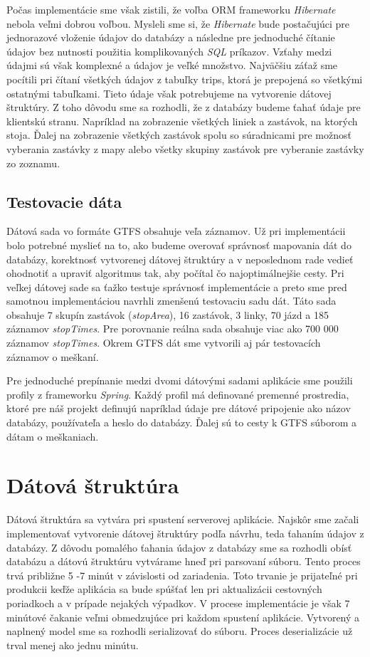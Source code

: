 Počas implementácie sme však zistili, že voľba ORM frameworku \textit{Hibernate} nebola veľmi dobrou voľbou. Mysleli sme si, že \textit{Hibernate} bude postačujúci pre jednorazové vloženie údajov do databázy a následne pre jednoduché čítanie údajov bez nutnosti použitia komplikovaných \textit{SQL} príkazov. Vzťahy medzi údajmi sú však komplexné a údajov je veľké množstvo. Najväčšiu záťaž sme pocítili pri čítaní všetkých údajov z tabuľky trips, ktorá je prepojená so všetkými ostatnými tabuľkami. Tieto údaje však potrebujeme na vytvorenie dátovej štruktúry. Z toho dôvodu sme sa rozhodli, že z databázy budeme ťahať údaje pre klientskú stranu. Napríklad na zobrazenie všetkých liniek a zastávok, na ktorých stoja. Ďalej na zobrazenie všetkých zastávok spolu so súradnicami pre možnosť vyberania zastávky z mapy alebo všetky skupiny zastávok pre vyberanie zastávky zo zoznamu.

\subsection{Testovacie dáta}
\label{sec:test-data}
Dátová sada vo formáte GTFS obsahuje veľa záznamov. Už pri implementácii bolo potrebné myslieť na to, ako budeme overovať správnosť mapovania dát do databázy, korektnosť vytvorenej dátovej štruktúry a v neposlednom rade vedieť ohodnotiť a upraviť algoritmus tak, aby počítal čo najoptimálnejšie cesty. Pri veľkej dátovej sade sa ťažko testuje správnosť implementácie a preto sme pred samotnou implementáciou navrhli zmenšenú testovaciu sadu dát. 
Táto sada obsahuje 7 skupín zastávok (\textit{stopArea}), 16 zastávok, 3 linky, 70 jázd a 185 záznamov \textit{stopTimes}. Pre porovnanie reálna sada obsahuje viac ako 700 000 záznamov \textit{stopTimes}. Okrem GTFS dát sme vytvorili aj pár testovacích záznamov o meškaní. 

Pre jednoduché prepínanie medzi dvomi dátovými sadami aplikácie sme použili profily z frameworku \textit{Spring}. Každý profil má definované premenné prostredia, ktoré pre náš projekt definujú napríklad údaje pre dátové pripojenie ako názov databázy, používateľa a heslo do databázy. Ďalej sú to cesty k GTFS súborom a dátam o meškaniach. 

\section{Dátová štruktúra}
Dátová štruktúra sa vytvára pri spustení serverovej aplikácie. Najskôr sme začali implementovať vytvorenie dátovej štruktúry podľa návrhu, teda ťahaním údajov z databázy. Z dôvodu pomalého ťahania údajov z databázy sme sa rozhodli obísť databázu a dátovú štruktúru vytvárame hneď pri parsovaní súboru. Tento proces trvá približne 5 -7 minút v závislosti od zariadenia. Toto trvanie je prijateľné pri produkcii keďže aplikácia sa bude spúšťať len pri aktualizácii cestovných poriadkoch a v prípade nejakých výpadkov. V procese implementácie je však 7 minútové čakanie veľmi obmedzujúce pri každom spustení aplikácie. Vytvorený a naplnený model sme sa rozhodli serializovať do súboru. Proces deserializácie už trval menej ako jednu minútu. 

